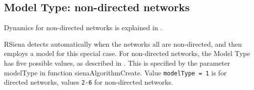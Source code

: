 \documentclass[a4paper,fleqn,11pt]{article}
\newcommand{\+}{\, + \,}
\newcommand{\sfn}[1]{\textsf{#1}}
\newcommand{\RS}{{\sf \textsf{RSiena} }}
\begin{document}

\subsection{Model Type: non-directed networks}
\label{S_modeltype_nd}

Dynamics for non-directed networks is explained in \citet{SnijdersPickup17}.

\RS detects automatically when the networks all are non-directed,
and then employs a model for this special case.
For non-directed networks, the Model Type has five possible values,
as described in \citet{SnijdersPickup17}.
This is specified by the parameter \sfn{modelType} in function
\textsf{sienaAlgorithmCreate}.
Value \texttt{modelType = 1} is for directed networks, values
\texttt{2-6} for non-directed networks.

\end{document}
